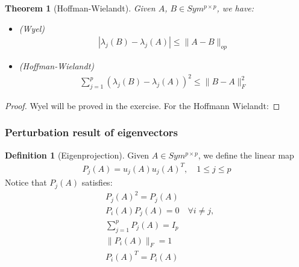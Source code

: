 \documentclass[a4paper,12pt, oneside, fleqn]{book}
\newtheorem{theorem}{Theorem}[section]
\theoremstyle{definition}
\newtheorem{definition}{Definition}[section]
\theoremstyle{remark}
\begin{document}
\begin{theorem}[Hoffman-Wielandt]
Given $A$, $B \in Sym^{p\times p}$, we have:
\begin{itemize}
	\item (Wyel)
	\begin{align*}
		|\lambda_j(B) - \lambda_j(A)| \leq \|A - B\|_{op}
	\end{align*}
	\item(Hoffman-Wielandt)
	\begin{align*}
		\sum_{j = 1}^p (\lambda_j(B) - \lambda_j(A))^2 \le \|B - A\|_F^2
	\end{align*}
\end{itemize}
\end{theorem}
\begin{proof}
	Wyel will be proved in the exercise. For the Hoffmann Wielandt:
\end{proof}



\subsubsection*{Perturbation result of eigenvectors}
\begin{definition}[Eigenprojection]
	Given $A \in Sym^{p\times p}$, we define the linear map
	\begin{align*}
		P_j(A) = u_j(A)u_j(A)^T, \quad 1 \le j \le p
	\end{align*}
	Notice that $P_j(A)$ satisfies:
	\begin{align*}
		&P_j(A)^2 = P_j(A)\\
		&P_i(A)P_j(A) = 0 \quad \forall i \neq j, \\
		&\sum_{j = 1}^pP_j(A) = I_p \\
		&\|P_i(A)\|_F = 1 \\
		&P_i(A)^T = P_i(A)\\
	\end{align*}
\end{definition}
\end{document}
